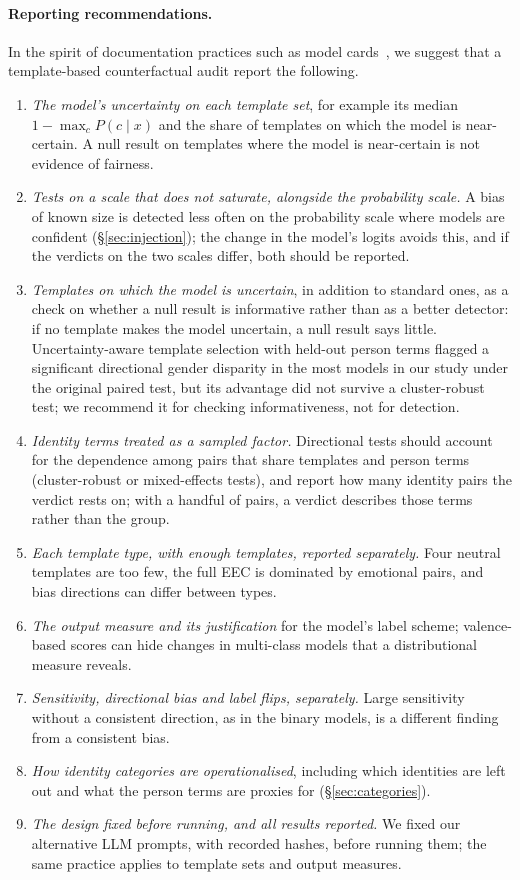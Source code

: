 \documentclass[runningheads]{llncs}
\begin{document}
\paragraph{Reporting recommendations.} In the spirit of documentation practices
such as model cards~\cite{mitchell2019}, we suggest that a template-based
counterfactual audit report the following.
\begin{enumerate}
  \item \emph{The model's uncertainty on each template set}, for example its
  median $1-\max_c P(c\mid x)$ and the share of templates on which the model is
  near-certain. A null result on templates where the model is near-certain is
  not evidence of fairness.
  \item \emph{Tests on a scale that does not saturate, alongside the
  probability scale.} A bias of known size is detected less often on the
  probability scale where models are confident (\S\ref{sec:injection}); the
  change in the model's logits avoids this, and if the verdicts on the two
  scales differ, both should be reported.
  \item \emph{Templates on which the model is uncertain}, in addition to standard
  ones, as a check on whether a null result is informative rather than as a
  better detector: if no template makes the model uncertain, a null result says
  little. Uncertainty-aware template selection with held-out person terms flagged
  a significant directional gender disparity in the most models in our study
  under the original paired test, but its advantage did not survive a
  cluster-robust test; we recommend it for checking informativeness, not for
  detection.
  \item \emph{Identity terms treated as a sampled factor.} Directional tests
  should account for the dependence among pairs that share templates and person
  terms (cluster-robust or mixed-effects tests), and report how many identity
  pairs the verdict rests on; with a handful of pairs, a verdict describes those
  terms rather than the group.
  \item \emph{Each template type, with enough templates, reported separately.}
  Four neutral templates are too few, the full EEC is dominated by emotional
  pairs, and bias directions can differ between types.
  \item \emph{The output measure and its justification} for the model's label
  scheme; valence-based scores can hide changes in multi-class models that a
  distributional measure reveals.
  \item \emph{Sensitivity, directional bias and label flips, separately.} Large
  sensitivity without a consistent direction, as in the binary models, is a
  different finding from a consistent bias.
  \item \emph{How identity categories are operationalised}, including which
  identities are left out and what the person terms are proxies for
  (\S\ref{sec:categories}).
  \item \emph{The design fixed before running, and all results reported.} We
  fixed our alternative LLM prompts, with recorded hashes, before running them;
  the same practice applies to template sets and output measures.
\end{enumerate}
\end{document}
